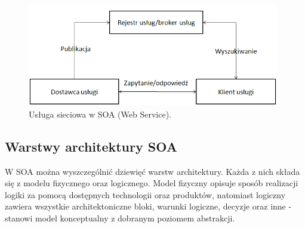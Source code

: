 \begin{figure}[h!tbp]
\begin{centering}
\includegraphics[width=11cm]{img/web_service.png}
\caption[Usługa sieciowa w SOA (Web Service).]{Usługa sieciowa w SOA (Web Service). \cite{AnRTeqq}}\label{soa_arch}
\end{centering}
\end{figure}

\subsection{Warstwy architektury SOA}
W SOA można wyszczególnić dziewięć warstw architektury. Każda z nich składa się z modelu fizycznego oraz logicznego. Model fizyczny opisuje sposób realizacji logiki za pomocą dostępnych technologii oraz produktów, natomiast logiczny zawiera wszystkie architektoniczne bloki, warunki logiczne, decyzje oraz inne - stanowi model konceptualny z dobranym poziomem abstrakcji.

